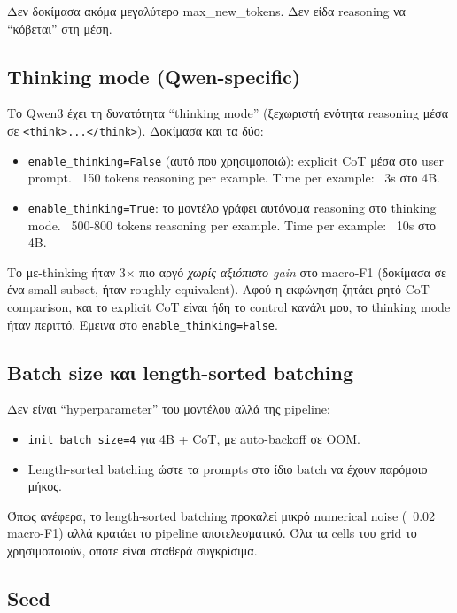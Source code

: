 \documentclass[12pt]{fphw}
\begin{document}
Δεν δοκίμασα ακόμα μεγαλύτερο max\_new\_tokens. Δεν είδα reasoning να ``κόβεται'' στη μέση.

\subsection{Thinking mode (Qwen-specific)}

Το Qwen3 έχει τη δυνατότητα ``thinking mode'' (ξεχωριστή ενότητα reasoning μέσα σε \texttt{<think>...</think>}). Δοκίμασα και τα δύο:

\begin{itemize}
    \item \texttt{enable\_thinking=False} (αυτό που χρησιμοποιώ): explicit CoT μέσα στο user prompt. ~150 tokens reasoning per example. Time per example: ~3s στο 4B.
    \item \texttt{enable\_thinking=True}: το μοντέλο γράφει αυτόνομα reasoning στο thinking mode. ~500-800 tokens reasoning per example. Time per example: ~10s στο 4B.
\end{itemize}

Το με-thinking ήταν 3× πιο αργό \emph{χωρίς αξιόπιστο gain} στο macro-F1 (δοκίμασα σε ένα small subset, ήταν roughly equivalent). Αφού η εκφώνηση ζητάει ρητό CoT comparison, και το explicit CoT είναι ήδη το control κανάλι μου, το thinking mode ήταν περιττό. Έμεινα στο \texttt{enable\_thinking=False}.

\subsection{Batch size και length-sorted batching}

Δεν είναι ``hyperparameter'' του μοντέλου αλλά της pipeline:

\begin{itemize}
    \item \texttt{init\_batch\_size=4} για 4B + CoT, με auto-backoff σε OOM.
    \item Length-sorted batching ώστε τα prompts στο ίδιο batch να έχουν παρόμοιο μήκος.
\end{itemize}

Όπως ανέφερα, το length-sorted batching προκαλεί μικρό numerical noise (~0.02 macro-F1) αλλά κρατάει το pipeline αποτελεσματικό. Όλα τα cells του grid το χρησιμοποιούν, οπότε είναι σταθερά συγκρίσιμα.

\subsection{Seed}
\end{document}
